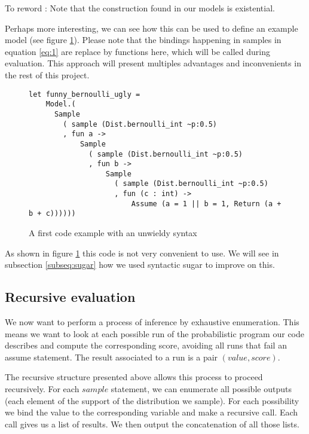 \documentclass{article}
\newcommand\SC[1]{{\color{violet}{\it \bf Simon :} #1}}
\begin{document}
\SC{To reword : Note that the construction found in our models is existential.}


Perhaps more interesting, we can see how this can be used to define an example model (see figure \ref{fig:UglyEx}).
Please note that the bindings happening in samples in equation \ref{eq:1} are replace by functions here, which will be called during evaluation.
This approach will present multiples advantages and inconvenients in the rest of this project.

\begin{figure}[h]
	\centering
	\begin{verbatim}
let funny_bernoulli_ugly =
    Model.(
      Sample
        ( sample (Dist.bernoulli_int ~p:0.5)
        , fun a ->
            Sample
              ( sample (Dist.bernoulli_int ~p:0.5)
              , fun b ->
                  Sample
                    ( sample (Dist.bernoulli_int ~p:0.5)
                    , fun (c : int) ->
                        Assume (a = 1 || b = 1, Return (a + b + c))))))

	\end{verbatim}

	\caption{A first code example with an unwieldy syntax}
	\label{fig:UglyEx}
\end{figure}

As shown in figure \ref{fig:UglyEx} this code is not very convenient to use. We will see in subsection \ref{subseq:sugar} how we used syntactic sugar to improve on this.

\subsection{Recursive evaluation}

We now want to perform a process of inference by exhaustive enumeration.
This means we want to look at each possible run of the probabilistic program our code describes and compute the corresponding score, avoiding all runs that fail an assume statement.
The result associated to a run is a pair $(value, score)$.

The recursive structure presented above allows this process to proceed recursively.
For each $sample$ statement, we can enumerate all possible outputs (each element of the support of the distribution we sample). For each possibility we bind the value to the corresponding variable and make a recursive call.
Each call gives us a list of results. We then output the concatenation of all those lists.
\end{document}
